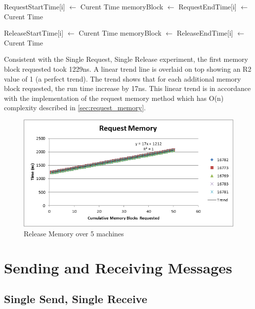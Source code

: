 \documentclass[12pt,twocolumn]{report}
\begin{document}
\begin{algorithmic}
      \State RequestStartTime[i] $\gets$ Curent Time
      \State memoryBlock $\gets$  
      \State RequestEndTime[i] $\gets$ Curent Time
    \EndFor
  \EndFunction
\end{algorithmic}

\begin{algorithmic}
      \State ReleaseStartTime[i] $\gets$ Curent Time
      \State memoryBlock $\gets$  
      \State ReleaseEndTime[i] $\gets$ Curent Time
    \EndFor
  \EndFunction
\end{algorithmic}

\par Consistent with the Single Request, Single Release experiment, the first memory block requested took 1229ns. A linear trend line is overlaid on top showing an R2 value of 1 (a perfect trend). The trend shows that for each additional memory block requested, the run time increase by 17ns. This linear trend is in accordance with the implementation of the request memory method which has O(n) complexity described in \ref{sec:request_memory}.

\begin{figure}[h!]
  \centering
    \includegraphics{RequestMemory.png}
  \caption{Release Memory over 5 machines}
\end{figure}

\section{Sending and Receiving Messages}
\subsection{Single Send, Single Receive}
\label{sec:single_send_single_receive}
\end{document}
